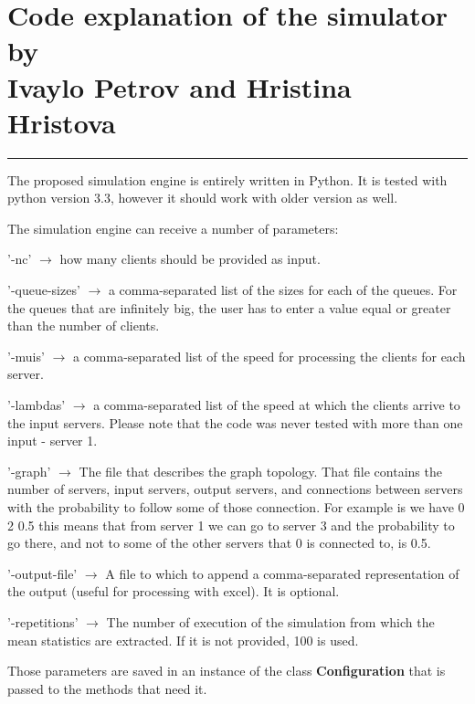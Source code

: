 \documentclass[12pt]{article}
\newcommand{\hr}{\rule{\linewidth}{0.1mm}}
\newenvironment{itemize*}{
  \begin{itemize}
    \setlength{\itemsep}{0pt}
    \setlength{\parskip}{0pt}
    \setlength{\parsep}{0pt}
}{
  \end{itemize}
}
\theoremstyle{plain}
\begin{document}
\section*{\centering
  Code explanation of the simulator
  by\\
  Ivaylo Petrov and Hristina Hristova 
}

\hr

The proposed simulation engine is entirely written in Python. It is tested with
python version 3.3, however it should work with older version as well.

The simulation engine can receive a number of parameters: 
\begin{itemize*}
  \item '-nc' $\rightarrow$ how many clients should be provided as input.
  \item '-queue-sizes' $\rightarrow$ a comma-separated list of the sizes for
    each of the queues. For the queues that are infinitely big, the user has to
    enter a value equal or greater than the number of clients.
  \item '-muis' $\rightarrow$ a comma-separated list of the speed for
    processing the clients for each server.
  \item '-lambdas' $ \rightarrow $ a comma-separated list of the speed at which
    the clients arrive to the input servers. Please note that the code was
    never tested with more than one input - server 1.
  \item '-graph' $ \rightarrow $ The file that describes the graph topology.
    That file contains the number of servers, input servers, output servers,
    and connections between servers with the probability to follow some of 
    those connection. For example is we have 0 2 0.5 this means that from 
    server 1 we can go to server 3 and the probability to go there, and not to
    some of the other servers that 0 is connected to, is 0.5.
  \item '-output-file' $ \rightarrow $ A file to which to append a
    comma-separated representation of the output (useful for processing with
    excel). It is optional.  
  \item '-repetitions' $ \rightarrow $ The number of execution of the simulation
    from which the mean statistics are extracted. If it is not provided, 100 is
    used.
\end{itemize*}

Those parameters are saved in an instance of the class \textbf{Configuration}
that is passed to the methods that need it.
\end{document}
